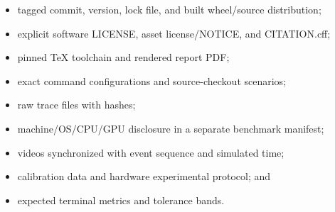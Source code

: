 \begin{itemize}
  \item tagged commit, version, lock file, and built wheel/source distribution;
  \item explicit software LICENSE, asset license/NOTICE, and CITATION.cff;
  \item pinned TeX toolchain and rendered report PDF;
  \item exact command configurations and source-checkout scenarios;
  \item raw trace files with hashes;
  \item machine/OS/CPU/GPU disclosure in a separate benchmark manifest;
  \item videos synchronized with event sequence and simulated time;
  \item calibration data and hardware experimental protocol; and
  \item expected terminal metrics and tolerance bands.
\end{itemize}

